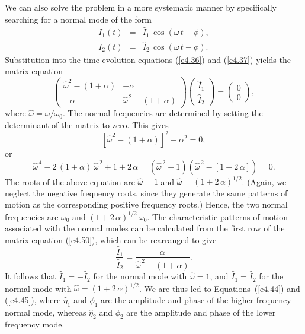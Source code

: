 {We can also solve the problem in a more systematic manner by specifically
searching for a normal mode of the form
\begin{eqnarray}
I_1(t) &=&\hat{I}_1\,\cos(\omega\,t-\phi),\\[0.5ex]
I_2(t) &=&\hat{I}_2\,\cos(\omega\,t-\phi).
\end{eqnarray}
Substitution into the time evolution equations (\ref{e4.36}) and (\ref{e4.37})
yields the matrix equation
\begin{equation}
\left(
\begin{array}{cc}
\hat{\omega}^2-(1+\alpha) & -\alpha\\[0.5ex]
-\alpha&\hat{\omega}^{\,2}-(1+\alpha)
\end{array}\right)\left(
\begin{array}{c}
\hat{I}_1\\[0.5ex] \hat{I}_2
\end{array}\right) = \left(
\begin{array}{c}
0\\[0.5ex] 0
\end{array}\right),\label{e4.50}
\end{equation}
where $\hat{\omega}=\omega/\omega_0$. The normal frequencies are
determined by setting the determinant of the matrix to zero. This gives
\begin{equation}
\left[\hat{\omega}^2-(1+\alpha)\right]^2-\alpha^2 = 0,
\end{equation}
or 
\begin{equation}
\hat{\omega}^{\,4} - 2\,(1+\alpha)\,\hat{\omega}^{\,2}+1+2\,\alpha
=\left(\hat{\omega}^{\,2}-1\right)\left(\hat{\omega}^{\,2}-[1+2\,\alpha]\right)=0.
\end{equation}
The roots of the above equation
are $\hat{\omega}=1$ and $\hat{\omega}=(1+2\,\alpha)^{1/2}$. (Again, we neglect the
negative frequency roots, since they generate the same patterns of motion as the
corresponding positive frequency roots.)
Hence, the two
normal frequencies are $\omega_0$ and $(1+2\,\alpha)^{1/2}\,\omega_0$.
The characteristic patterns of motion associated with the normal modes
can be calculated from the first row of the matrix equation (\ref{e4.50}),
which can be rearranged to give
\begin{equation}
\frac{\hat{I}_1}{\hat{I}_2}= \frac{\alpha}{\hat{\omega}^{\,2}-(1+\alpha)}.
\end{equation}
It follows that $\hat{I}_1=-\hat{I}_2$ for the normal mode with $\hat{\omega}=1$,
and $\hat{I}_1=\hat{I}_2$ for the normal mode with $\hat{\omega}=(1+2\,\alpha)^{1/2}$. We are thus led to Equations~(\ref{e4.44}) and (\ref{e4.45}), where
$\hat{\eta}_1$ and $\phi_1$ are the amplitude and phase of the higher frequency
normal mode, whereas $\hat{\eta}_2$ and $\phi_2$ are the amplitude and phase of the lower frequency
 mode.
 
}
